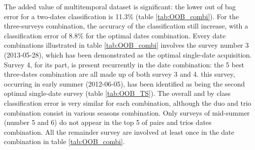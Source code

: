 \documentclass[remotesensing,article,submit,moreauthors,pdftex,12pt,a4paper]{mdpi} %
\begin{document}
The added value of multitemporal dataset is significant: the lower out of bag error for a two-dates classification is 11.3\% (table \ref{tab:OOB_combi}). For the three-surveys combination, the accuracy of the classification still increase, with a classification error of 8.8\% for the optimal dates combination.
Every date combinations illustrated in table \ref{tab:OOB_combi} involves the survey number 3 (2013-05-28), which has been demonstrated as the optimal single-date acquisition.  
Survey 4, for its part, is present recurrently in the date combination: the 5 best three-dates combination are all made up of both survey 3 and 4. 
this survey, occurring in early summer (2012-06-05), has been identified as being the second optimal single-date survey (table \ref{tab:OOB_TS}). 
The overall and by class classification error is very similar for each combination, although the duo and trio combination consist in various seasons combination. 
Only surveys of mid-summer (number 5 and 6) do not appear in the top 5 of pairs and trios dates combination. All the remainder survey are involved at least once in the date combination in table \ref{tab:OOB_combi}.
\end{document}
